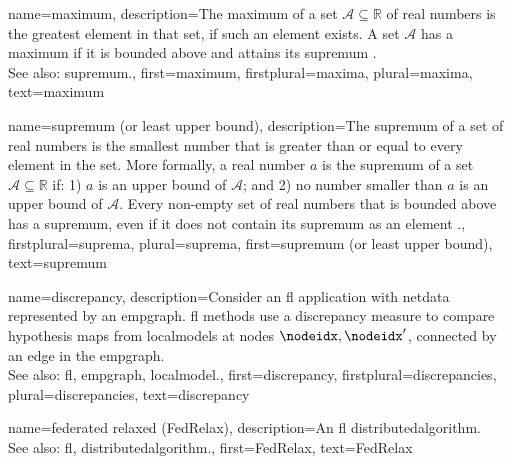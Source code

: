 {name={maximum},
	description={The maximum of a set $\mathcal{A} \subseteq \mathbb{R}$ 
     		of real numbers is the greatest element in that set, if such an element exists. A set $\mathcal{A}$ 
     		has a maximum if it is bounded above and attains its \gls{supremum} \cite[Sec.~1.4]{RudinBookPrinciplesMatheAnalysis}.
				\\ 
		See also: \gls{supremum}.},
 	first={maximum},
 	firstplural={maxima},
 	plural={maxima},
 	text={maximum}
}

{name={supremum (or least upper bound)},
	description={The supremum of a set of real numbers is 
		the smallest number that is greater than or equal to every element in the set. More formally, a 
		real number $a$ is the supremum of a set $\mathcal{A} \subseteq \mathbb{R}$ if: 1) $a$ 
		is an upper bound of $\mathcal{A}$; and 2) no number smaller than $a$ is an upper bound of $\mathcal{A}$. 
		Every non-empty set of real numbers that is bounded above has a supremum, even if it does 
		not contain its supremum as an element \cite[Sec.~1.4]{RudinBookPrinciplesMatheAnalysis}.},
	firstplural={suprema}, 
  	plural={suprema},
	first={supremum (or least upper bound)},
	text={supremum}
}

{name={discrepancy},
	description={Consider an \gls{fl} application with \gls{netdata} 
		represented by an \gls{empgraph}. \gls{fl} methods use a discrepancy measure 
		to compare \gls{hypothesis} \glspl{map} from \glspl{localmodel} at nodes $\nodeidx,\nodeidx'$, 
		connected by an edge in the \gls{empgraph}.
					\\ 
		See also: \gls{fl}, \gls{empgraph}, \gls{localmodel}.},
	first={discrepancy},
	firstplural={discrepancies}, 
  	plural={discrepancies}, 
	text={discrepancy}
}

{name={federated relaxed (FedRelax)},
	description={An \gls{fl} \gls{distributedalgorithm}. 
		\\ 
		See also: \gls{fl}, \gls{distributedalgorithm}.},
	first={FedRelax},
	text={FedRelax}
} 


